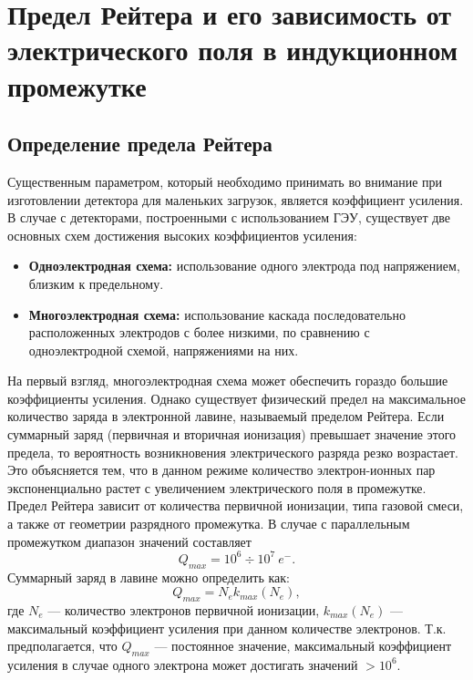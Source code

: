 \chapter{Предел Рейтера и его зависимость от электрического поля в индукционном промежутке}
\label{sec:raether_exp}
\section{Определение предела Рейтера}
Существенным параметром, который необходимо принимать во внимание при изготовлении детектора для маленьких загрузок, является коэффициент усиления. В случае с детекторами, построенными с использованием ГЭУ, существует две основных схем достижения высоких коэффициентов усиления: 
\begin{itemize}
	\item\textbf{Одноэлектродная схема:} использование одного электрода под напряжением, близким к предельному.
	\item\textbf{Многоэлектродная схема:} использование каскада последовательно расположенных электродов с более низкими, по сравнению с одноэлектродной схемой, напряжениями на них. 
\end{itemize}
\par На первый взгляд, многоэлектродная схема может обеспечить гораздо большие коэффициенты усиления. Однако существует физический предел на максимальное количество заряда в электронной лавине, называемый пределом Рейтера. Если суммарный заряд (первичная и вторичная ионизация) превышает значение этого предела, то вероятность возникновения электрического разряда резко возрастает. Это объясняется тем, что в данном режиме количество электрон-ионных пар экспоненциально растет с увеличением электрического поля в промежутке.
Предел Рейтера зависит от количества первичной ионизации, типа газовой смеси, а также от геометрии разрядного промежутка. 
В случае с параллельным промежутком диапазон значений составляет \cite{Peskov}
\begin{equation}
Q_{max} = 10^6\div10^7~e^-.
\end{equation}
Суммарный заряд в лавине можно определить как: 
 \begin{equation}
 Q_{max} = N_e k_{max}(N_e),
 \label{Q(max)}
 \end{equation}
 где $N_e$ --- количество электронов первичной ионизации, $k_{max}(N_e)$ --- максимальный коэффициент усиления при данном количестве электронов. Т.к. предполагается, что $Q_{max}$ --- постоянное значение, максимальный коэффициент усиления в случае одного электрона может достигать значений $>10^6$. 
